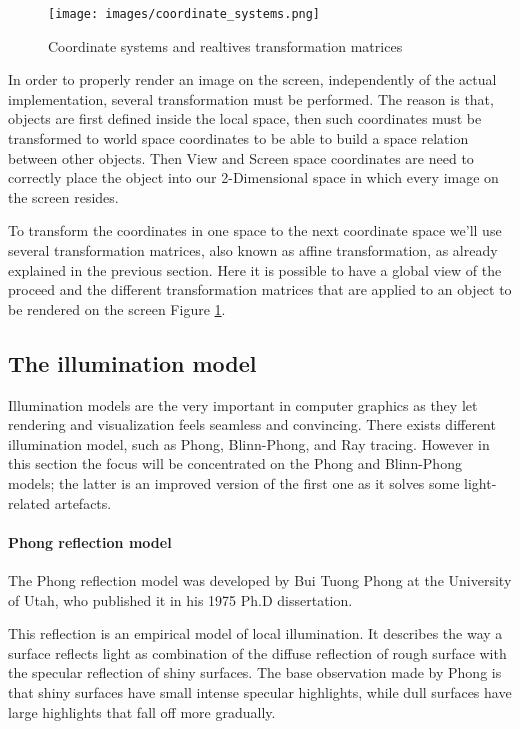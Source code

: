 \documentclass[12pt,a4paper]{extarticle}
\begin{document}
\begin{figure}[hbtp]
\centering
\texttt{[image: images/coordinate\_systems.png]}
\caption{Coordinate systems and realtives transformation matrices}
\label{fig:coordinate_systems}
\end{figure}

In order to properly render an image on the screen, independently of the actual implementation, several transformation must be performed. The reason is that, objects are first defined inside the local space, then such coordinates must be transformed to world space coordinates to be able to build a space relation between other objects. Then View and Screen space coordinates are need to correctly place the object into our 2-Dimensional space in which every image on the screen resides.


To transform the coordinates in one space to the next coordinate space we'll use several transformation matrices, also known as affine transformation, as already explained in the previous section.
Here it is possible to have a global view of the proceed and the different transformation matrices that are applied to an object to be rendered on the screen Figure \ref{fig:coordinate_systems}.

\pagebreak
\subsection{The illumination model} %
Illumination models are the very important in computer graphics as they let rendering and visualization feels seamless and convincing. %
There exists different illumination model, such as Phong, Blinn-Phong, and Ray tracing. However in this section the focus will be concentrated on the Phong and Blinn-Phong models; the latter is an improved version of the first one as it solves some light-related artefacts.

\paragraph{Phong reflection model} The Phong reflection model was developed by Bui Tuong Phong at the University of Utah, who published it in his 1975 Ph.D dissertation.

This reflection is an empirical model of local illumination. It describes the way a surface reflects light as combination of the diffuse reflection of rough surface with the specular reflection of shiny surfaces. The base observation made by Phong is that shiny surfaces have small intense specular highlights, while dull surfaces have large highlights that fall off more gradually. 
\end{document}
